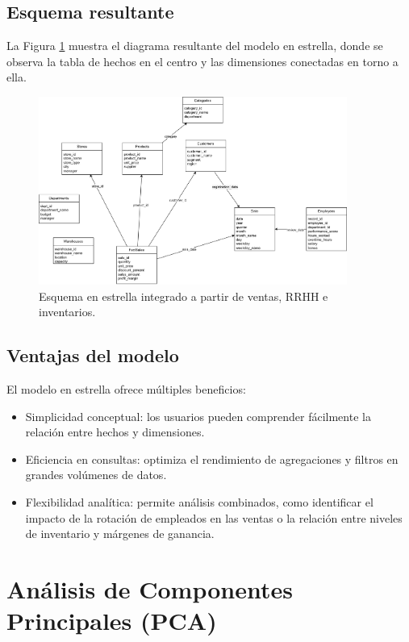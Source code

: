\documentclass[12pt,a4paper]{article}
\begin{document}
\subsection{Esquema resultante}
La Figura \ref{fig:star_schema} muestra el diagrama resultante del modelo en 
estrella, donde se observa la tabla de hechos en el centro y las dimensiones 
conectadas en torno a ella.

\begin{figure}[H]
    \centering
    \includegraphics[width=0.9\textwidth]{figures/star_schema.png}
    \caption{Esquema en estrella integrado a partir de ventas, RRHH e inventarios.}
    \label{fig:star_schema}
\end{figure}

\subsection{Ventajas del modelo}
El modelo en estrella ofrece múltiples beneficios:
\begin{itemize}
    \item Simplicidad conceptual: los usuarios pueden comprender fácilmente la 
    relación entre hechos y dimensiones.
    \item Eficiencia en consultas: optimiza el rendimiento de agregaciones y filtros 
    en grandes volúmenes de datos.
    \item Flexibilidad analítica: permite análisis combinados, como identificar el 
    impacto de la rotación de empleados en las ventas o la relación entre niveles de 
    inventario y márgenes de ganancia.
\end{itemize}


\section{Análisis de Componentes Principales (PCA)}
\end{document}
